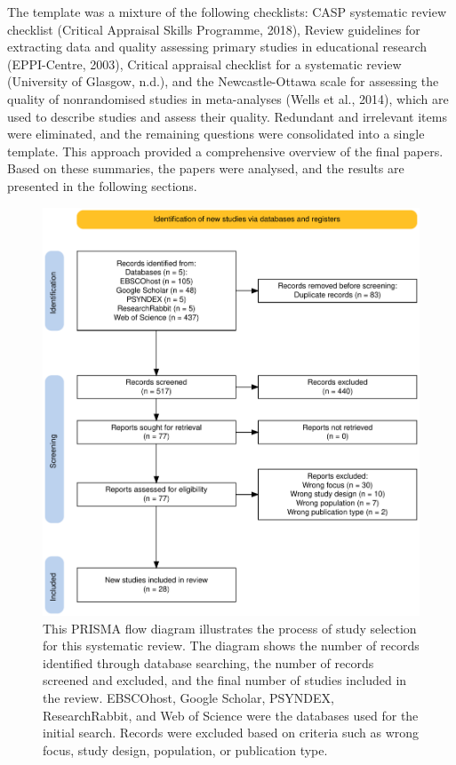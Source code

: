 \documentclass[
  stu, a4paper,floatsintext]{apa7}
\begin{document}
The template was a mixture of the following checklists: CASP systematic review checklist (Critical Appraisal Skills Programme, 2018), Review guidelines for extracting data and quality assessing primary studies in educational research (EPPI-Centre, 2003), Critical appraisal checklist for a systematic review (University of Glasgow, n.d.), and the Newcastle-Ottawa scale for assessing the quality of nonrandomised studies in meta-analyses (Wells et al., 2014), which are used to describe studies and assess their quality.
Redundant and irrelevant items were eliminated, and the remaining questions were consolidated into a single template.
This approach provided a comprehensive overview of the final papers.
Based on these summaries, the papers were analysed, and the results are presented in the following sections.

\begin{figure}
\centering
\includegraphics{../files/prisma.pdf}
\caption{\label{fig:prisma}This PRISMA flow diagram illustrates the process of study selection for this systematic review. The diagram shows the number of records identified through database searching, the number of records screened and excluded, and the final number of studies included in the review. EBSCOhost, Google Scholar, PSYNDEX, ResearchRabbit, and Web of Science were the databases used for the initial search. Records were excluded based on criteria such as wrong focus, study design, population, or publication type.}
\end{figure}
\end{document}
